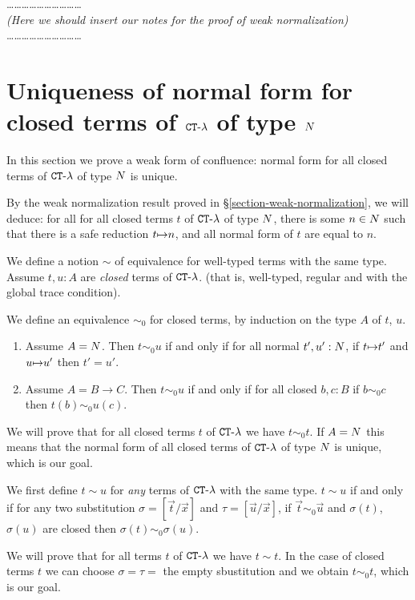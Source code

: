 \documentclass{article}
\begin{document}
\ldots\ldots\ldots\ldots\ldots\ldots\ldots\ldots\ldots\ldots
\\
\emph{(Here we should insert our notes for the proof of weak normalization)}
\ldots\ldots\ldots\ldots\ldots\ldots\ldots\ldots\ldots\ldots
\\


\section{Uniqueness of normal form for closed terms of ${ {\tt CT} \mbox{-} \lambda}$ of type ${N}$}
In this section we prove a weak form of confluence: normal form for
all closed terms of ${ {\tt CT} \mbox{-} \lambda}$ of type ${N}$ is unique.

By the weak normalization result proved in \S  \ref{section-weak-normalization},
we will deduce: for all for all closed terms $t$ of ${ {\tt CT} \mbox{-} \lambda}$ of type ${N}$, 
there is some $n \in {N}$ such that there is a safe reduction $t {\mapsto} n$, and all normal form of $t$
are equal to $n$.

We define a notion $\sim$ of equivalence for well-typed terms with the same type.
Assume $t, u : A$ are \emph{closed} terms of ${ {\tt CT} \mbox{-} \lambda}$.
 (that is, well-typed, regular and with the global trace condition). 

We define an equivalence $\sim_0$ for closed terms,
by induction on the type $A$ of $t$, $u$.

\begin{enumerate}
\item
Assume $A = {N}$. Then $t \sim_0 u$ if and only if for all normal $t',u':{N}$, if $t {\mapsto} t'$
and $u {\mapsto} u'$ then $t'=u'$.
\item
Assume $A = B \rightarrow C$. Then $t \sim_0 u$ if and only if for all closed $b,c:B$ if
$b \sim_0 c$ then $t(b) \sim_0 u(c)$.
\end{enumerate}

We will prove that for all closed terms $t$ of ${ {\tt CT} \mbox{-} \lambda}$ we have $t \sim_0 t$.
If $A={N}$ this means that the normal form of all closed terms of ${ {\tt CT} \mbox{-} \lambda}$ of type ${N}$ is unique,
which is our goal.

We first define $t \sim u$ for \emph{any} terms of ${ {\tt CT} \mbox{-} \lambda}$ with the same type.
 $t \sim u$ if and only if for any two substitution 
$\sigma = [\vec{t} / \vec{x}]$ and $\tau = [\vec{u} / \vec{x}]$,
if $\vec{t} \sim_0 \vec{u}$ and $\sigma(t)$, $\sigma(u)$ are closed then $\sigma(t) \sim_0 \sigma(u)$.

We will prove that  for all terms $t$ of ${ {\tt CT} \mbox{-} \lambda}$ we have $t \sim t$. In the case of closed terms $t$
we can choose $\sigma=\tau=$ the empty sbustitution and we obtain $t \sim_0 t$, which is our goal.
\end{document}
